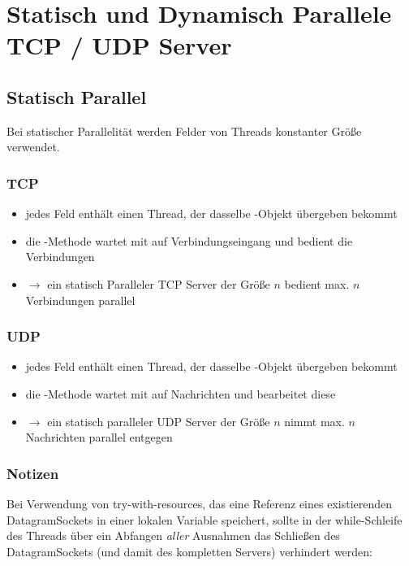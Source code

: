 \section{Statisch und Dynamisch Parallele TCP / UDP Server}

\subsection{Statisch Parallel}

Bei statischer Parallelität werden Felder von Threads konstanter Größe verwendet.
\subsubsection{TCP}

\begin{itemize}
    \item jedes Feld enthält einen Thread, der dasselbe -Objekt übergeben bekommt
    \item die -Methode wartet mit  auf Verbindungseingang und bedient die Verbindungen
    \item $\rightarrow$ ein statisch Paralleler TCP Server der Größe $n$ bedient max. $n$ Verbindungen parallel
\end{itemize}


\subsubsection{UDP}

\begin{itemize}
    \item jedes Feld enthält einen Thread, der dasselbe -Objekt übergeben bekommt
    \item die -Methode wartet mit  auf Nachrichten und bearbeitet diese
    \item $\rightarrow$ ein statisch paralleler UDP Server der Größe $n$ nimmt max. $n$ Nachrichten parallel entgegen
\end{itemize}

\subsubsection*{Notizen}
Bei Verwendung von try-with-resources, das eine Referenz eines existierenden DatagramSockets in einer lokalen Variable speichert,
sollte in der while-Schleife des Threads über ein Abfangen \textit{aller} Ausnahmen das Schließen des DatagramSockets (und damit des kompletten Servers)
verhindert werden:

